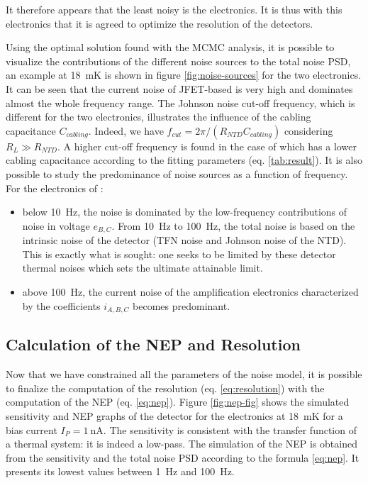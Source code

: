 It therefore appears that the least noisy is the \Edelweiss{} electronics. It is thus with this electronics that it is agreed to optimize the resolution of the detectors. 

Using the optimal solution found with the MCMC analysis, it is possible to visualize the contributions of the different noise sources to the total noise PSD, an example at \SI{18}{\milli\kelvin} is shown in figure \ref{fig:noise-sources} for the two electronics. It can be seen that the current noise of JFET-based is very high and dominates almost the whole frequency range. The Johnson noise cut-off frequency, which is different for the two electronics, illustrates the influence of the cabling capacitance $C_{cabling}$. Indeed, we have $f_{cut} = 2\pi/(R_{NTD} C_{cabling})$ considering $R_L\gg R_{NTD}$. A higher cut-off frequency is found in the case of \Edelweiss{} which has a lower cabling capacitance according to the fitting parameters (eq. \ref{tab:result}). It is also possible to study the predominance of noise sources as a function of frequency. For the electronics of \Edelweiss{}:
\begin{itemize}
\item below \SI{10}{\Hz}, the noise is dominated by the low-frequency contributions of noise in voltage $e_{B,C}$.
From \SI{10}{\Hz} to \SI{100}{\Hz}, the total noise is based on the intrinsic noise of the detector (TFN noise and Johnson noise of the NTD). This is exactly what is sought: one seeks to be limited by these detector thermal noises which sets the ultimate attainable limit.
\item above \SI{100}{\Hz}, the current noise of the amplification electronics characterized by the coefficients $i_{A,B,C}$ becomes predominant.
\end{itemize} 


\subsection{Calculation of the NEP and Resolution}
\label{par:nep-res}

Now that we have constrained all the parameters of the noise model, it is possible to finalize the computation of the resolution (eq. \ref{eq:resolution}) with the computation of the NEP (eq. \ref{eq:nep}). Figure \ref{fig:nep-fig} shows the simulated sensitivity and NEP graphs of the detector for the \Edelweiss{} electronics at \SI{18}{\milli\kelvin} for a bias current $I_P = \SI{1}{\nano\ampere}$. The sensitivity is consistent with the transfer function of a thermal system: it is indeed a low-pass. The simulation of the NEP is obtained from the sensitivity and the total noise PSD according to the formula \ref{eq:nep}. It presents its lowest values between \SI{1}{\Hz} and \SI{100}{\Hz}. 

